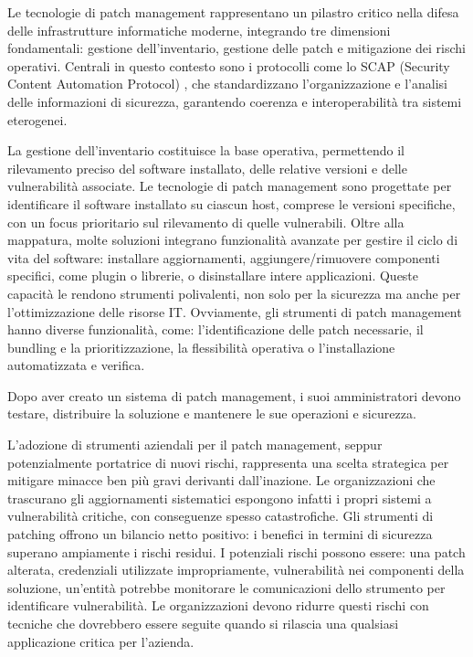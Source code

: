                 Le tecnologie di patch management rappresentano un pilastro critico nella difesa delle infrastrutture informatiche moderne, integrando tre dimensioni fondamentali: gestione dell'inventario, gestione delle patch e mitigazione dei rischi operativi. Centrali in questo contesto sono i protocolli come lo SCAP (Security Content Automation Protocol) \cite{scap_protocolsecurity}, che standardizzano l'organizzazione e l'analisi delle informazioni di sicurezza, garantendo coerenza e interoperabilità tra sistemi eterogenei.
                
                La gestione dell'inventario costituisce la base operativa, permettendo il rilevamento preciso del software installato, delle relative versioni e delle vulnerabilità associate. Le tecnologie di patch management sono progettate per identificare il software installato su ciascun host, comprese le versioni specifiche, con un focus prioritario sul rilevamento di quelle vulnerabili. Oltre alla mappatura, molte soluzioni integrano funzionalità avanzate per gestire il ciclo di vita del software: installare aggiornamenti, aggiungere/rimuovere componenti specifici, come plugin o librerie, o disinstallare intere applicazioni. Queste capacità le rendono strumenti polivalenti, non solo per la sicurezza ma anche per l'ottimizzazione delle risorse IT. Ovviamente, gli strumenti di patch management hanno diverse funzionalità, come: l'identificazione delle patch necessarie, il bundling e la prioritizzazione, la flessibilità operativa o l'installazione automatizzata e verifica.

                Dopo aver creato un sistema di patch management, i suoi amministratori devono testare, distribuire la soluzione e mantenere le sue operazioni e sicurezza.

                L'adozione di strumenti aziendali per il patch management, seppur potenzialmente portatrice di nuovi rischi, rappresenta una scelta strategica per mitigare minacce ben più gravi derivanti dall'inazione. Le organizzazioni che trascurano gli aggiornamenti sistematici espongono infatti i propri sistemi a vulnerabilità critiche, con conseguenze spesso catastrofiche. Gli strumenti di patching offrono un bilancio netto positivo: i benefici in termini di sicurezza superano ampiamente i rischi residui. I potenziali rischi possono essere: una patch alterata, credenziali utilizzate impropriamente, vulnerabilità nei componenti della soluzione, un'entità potrebbe monitorare le comunicazioni dello strumento per identificare vulnerabilità. Le organizzazioni devono ridurre questi rischi con tecniche che dovrebbero essere seguite quando si rilascia una qualsiasi applicazione critica per l'azienda.

